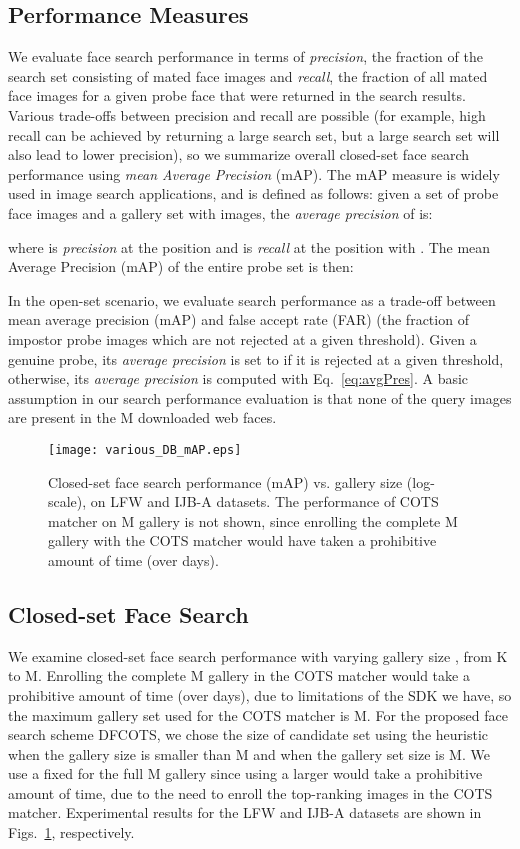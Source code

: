 \documentclass[10pt,journal,compsoc]{IEEEtran}
\begin{document}
\subsection{Performance Measures}\label{sec:performance}
We evaluate face search performance in terms of \emph{precision}, the fraction of the search set consisting of mated face images and \emph{recall}, the fraction of all mated face images for a given probe face that were returned in the search results. Various trade-offs between precision and recall are possible (for example, high recall can be achieved by returning a large search set, but a large search set will also lead to lower precision), so we summarize overall closed-set face search performance using \emph{mean Average Precision} (mAP). The mAP measure is widely used in image search applications, and is defined as follows: given a set of  probe face images  and a gallery set with  images, the \emph{average precision} of  is:


\noindent where  is \emph{precision} at the position  and  is \emph{recall} at the position  with . The mean Average Precision (mAP) of the entire probe set is then:


\noindent In the open-set scenario, we evaluate search performance as a trade-off between mean average precision (mAP) and false accept rate (FAR) (the fraction of impostor probe images which are not rejected at a given threshold). Given a genuine probe, its \emph{average precision} is set to  if it is rejected at a given threshold, otherwise, its \emph{average precision} is computed with Eq.~\ref{eq:avgPres}. A basic assumption in our search performance evaluation is that none of the query images are present in the M downloaded web faces.

\begin{figure}[htbp]
  \centering
  \texttt{[image: various\_DB\_mAP.eps]}
  \caption{Closed-set face search performance (mAP) vs. gallery size  (log-scale), on LFW and IJB-A datasets. The performance of COTS matcher on M gallery is not shown, since enrolling the complete M gallery with the COTS matcher would have taken a prohibitive amount of time (over  days).}
  \label{fig:exp_dbsize}
\end{figure}

\subsection{Closed-set Face Search}
We examine closed-set face search performance with varying gallery size , from K to M. Enrolling the complete M gallery in the COTS matcher would take a prohibitive amount of time (over  days), due to limitations of the SDK we have, so the maximum gallery set used for the COTS matcher is M. For the proposed face search scheme DFCOTS, we chose the size of candidate set  using the heuristic  when the gallery size is smaller than M and  when the gallery set size is M. We use a fixed  for the full M gallery since using a  larger  would take a prohibitive amount of time, due to the need to enroll the top-ranking images in the COTS matcher. Experimental results for the LFW and IJB-A datasets are shown in Figs.~\ref{fig:exp_dbsize}, respectively.
\end{document}
